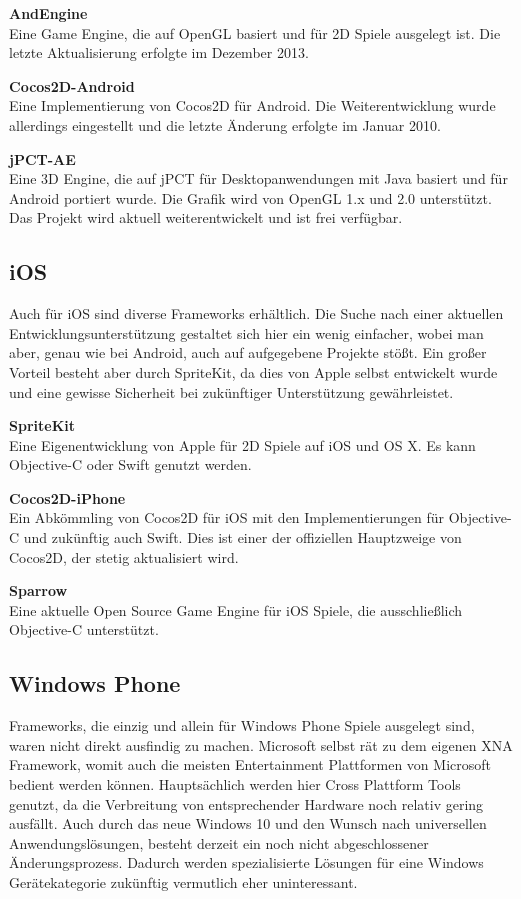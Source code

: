 \bigskip
\textbf{AndEngine}\\
Eine Game Engine, die auf OpenGL basiert und für 2D Spiele ausgelegt ist.
Die letzte Aktualisierung erfolgte im Dezember 2013.

\bigskip
\textbf{Cocos2D-Android}\\
Eine Implementierung von Cocos2D für Android. Die Weiterentwicklung wurde allerdings eingestellt und die letzte Änderung erfolgte im Januar 2010.

\bigskip
\textbf{jPCT-AE}\\
Eine 3D Engine, die auf jPCT für Desktopanwendungen mit Java basiert und für Android portiert wurde. Die Grafik wird von OpenGL 1.x und 2.0 unterstützt. Das Projekt wird aktuell weiterentwickelt und ist frei verfügbar.

\subsection{iOS}
Auch für iOS sind diverse Frameworks erhältlich. Die Suche nach einer aktuellen Entwicklungsunterstützung gestaltet sich hier ein wenig einfacher, wobei man aber, genau wie bei Android, auch auf aufgegebene Projekte stößt. Ein großer Vorteil besteht aber durch SpriteKit, da dies von Apple selbst entwickelt wurde und eine gewisse Sicherheit bei zukünftiger Unterstützung gewährleistet.

\bigskip
\textbf{SpriteKit}\\
Eine Eigenentwicklung von Apple für 2D Spiele auf iOS und OS X. Es kann Objective-C oder Swift genutzt werden.

\bigskip
\textbf{Cocos2D-iPhone}\\
Ein Abkömmling von Cocos2D für iOS mit den Implementierungen für Objective-C und zukünftig auch Swift. Dies ist einer der offiziellen Hauptzweige von Cocos2D, der stetig aktualisiert wird.

\bigskip
\textbf{Sparrow}\\
Eine aktuelle Open Source Game Engine für iOS Spiele, die ausschließlich Objective-C unterstützt.


\subsection{Windows Phone}
Frameworks, die einzig und allein für Windows Phone Spiele ausgelegt sind, waren nicht direkt ausfindig zu machen. Microsoft selbst rät zu dem eigenen XNA Framework, womit auch die meisten Entertainment Plattformen von Microsoft bedient werden können. Hauptsächlich werden hier Cross Plattform Tools genutzt, da die Verbreitung von entsprechender Hardware noch relativ gering ausfällt. Auch durch das neue Windows 10 und den Wunsch nach universellen Anwendungslösungen, besteht derzeit ein noch nicht abgeschlossener Änderungsprozess. Dadurch werden spezialisierte Lösungen für eine Windows Gerätekategorie zukünftig vermutlich eher uninteressant.

